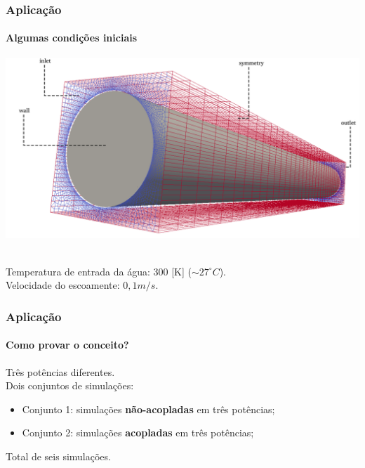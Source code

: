 \documentclass[svgnames,smaller,table]{beamer}
\begin{document}
\begin{frame}
  \frametitle{Aplicação}
  \framesubtitle{Algumas condições iniciais}
  \centering\includegraphics[scale=0.32]{../figuras/inlet_paredes_extremos_wireframe2.png}
  \vspace{0.2cm}
  \raggedright
  \\
  Temperatura de entrada da água: 300 [K] ($\sim27^{\circ}C$).
  \\
  Velocidade do escoamente: $0,1 m/s$.
\end{frame}

\begin{frame}
  \frametitle{Aplicação}
  \framesubtitle{Como provar o conceito?}
  Três potências diferentes.
  \\
  \vspace{0.2cm}
  Dois conjuntos de simulações:
  \vspace{0.2cm}
  \begin{itemize}
  \item Conjunto 1: simulações \textbf{não-acopladas} em três potências; 
  \item Conjunto 2: simulações \textbf{acopladas} em três potências; 
  \end{itemize}
  \vspace{0.2cm}
  Total de seis simulações.
  
\end{frame}

\end{document}

